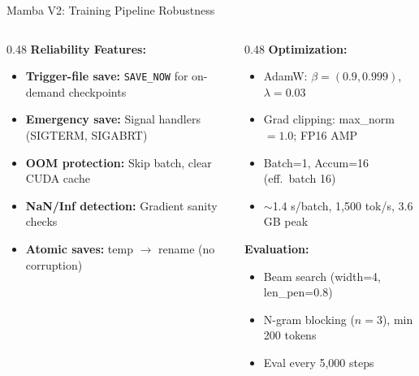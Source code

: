 \documentclass[10pt, aspectratio=169]{beamer}
\begin{document}
\begin{frame}{Mamba V2: Training Pipeline Robustness}
  \small
  \begin{columns}[T]
    \begin{column}{0.48\textwidth}
      \textbf{Reliability Features:}
      \begin{itemize}\setlength{\itemsep}{0pt}
        \item \textbf{Trigger-file save:} \texttt{SAVE\_NOW} for on-demand checkpoints
        \item \textbf{Emergency save:} Signal handlers (SIGTERM, SIGABRT)
        \item \textbf{OOM protection:} Skip batch, clear CUDA cache
        \item \textbf{NaN/Inf detection:} Gradient sanity checks
        \item \textbf{Atomic saves:} temp $\rightarrow$ rename (no corruption)
      \end{itemize}
    \end{column}
    \begin{column}{0.48\textwidth}
      \textbf{Optimization:}
      \begin{itemize}\setlength{\itemsep}{0pt}
        \item AdamW: $\beta{=}(0.9, 0.999)$, $\lambda{=}0.03$
        \item Grad clipping: max\_norm $= 1.0$; FP16 AMP
        \item Batch=1, Accum=16 (eff.\ batch 16)
        \item $\sim$1.4 s/batch, 1,500 tok/s, 3.6\,GB peak
      \end{itemize}

      \vspace{0.1cm}
      \textbf{Evaluation:}
      \begin{itemize}\setlength{\itemsep}{0pt}
        \item Beam search (width=4, len\_pen=0.8)
        \item N-gram blocking ($n{=}3$), min 200 tokens
        \item Eval every 5,000 steps
      \end{itemize}
    \end{column}
  \end{columns}
\end{frame}
\end{document}
